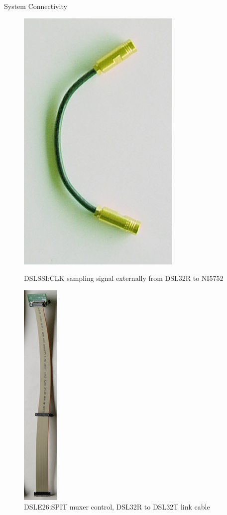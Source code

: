 \documentclass[t,12pt,english
\ifx\beamermode\undefined\else,\beamermode\fi
]{beamer}
\begin{document}
\begin{frame}{System Connectivity}
\begin{figure}[!htb]
\includegraphics[width=.3\textwidth, angle =90 ]{23.png}
\caption{\tiny{DSLSSI:CLK sampling signal externally from DSL32R to NI5752}}
\endminipage
{}
\centering
\includegraphics[width=.15\textwidth, angle =90 ]{24.png}
\caption{\tiny{DSLE26:SPIT muxer control, DSL32R to DSL32T link cable}}
\endminipage
\end{figure}
\end{frame}
\end{document}

